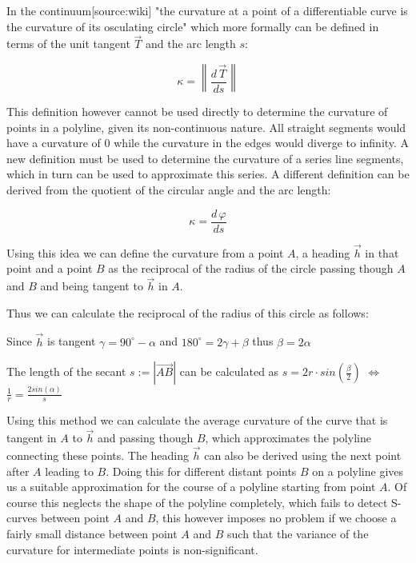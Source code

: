 \vskip 0.2in

In the continuum[source:wiki] "the curvature at a point of a differentiable curve is the curvature of its osculating circle"  which more formally can be defined in terms of the unit tangent $\vec T$ and the arc length $s$: \citep{CurvatureDefinition} \citep{Aup91}

$$\kappa  = \left\| {\frac{{d\,\vec T}}{{ds}}} \right\|$$

This definition however cannot be used directly to determine the curvature of points in a polyline, given its non-continuous nature. All straight segments would have a curvature of $0$ while the curvature in the edges would diverge to infinity. A new definition must be used to determine the curvature of a series line segments, which in turn can be used to approximate this series. A different definition can be derived from the quotient of the circular angle and the arc length:

$$\kappa  =  {\frac{{d\,\varphi}}{{ds}}}$$


Using this idea we can define the curvature from a point $A$, a heading  $\vec h$ in that point and a point $B$ as the reciprocal of the radius of the circle passing though $A$ and $B$ and being tangent to  $\vec h$ in $A$.


Thus we can calculate the reciprocal of the radius of this circle as follows:

Since $\vec h$ is tangent $\gamma=90^{\circ} - \alpha$ and $180^{\circ}=2\gamma+\beta$ thus $\beta = 2 \alpha$


The length of the secant $s:=|\vec{AB}|$ can be calculated as
$s = 2r \cdot  sin(\frac{\beta}{2})$
$\Leftrightarrow$
$\frac{1}{r} = \frac{2sin(\alpha)}{s}$


\vskip 0.2in

Using this method we can calculate the average curvature of the curve that is tangent in $A$ to $\vec h$ and passing though $B$, which approximates the polyline connecting these points. The heading  $\vec h$ can also be derived using the next point after $A$ leading to $B$.
Doing this for different distant points $B$ on a polyline gives us a suitable approximation for the course of a polyline starting from point $A$. Of course this neglects the shape of the polyline completely, which fails to detect S-curves between point $A$ and $B$, this however imposes no problem if we choose a fairly small distance between point $A$ and $B$ such that the variance of the curvature for intermediate points is non-significant.


